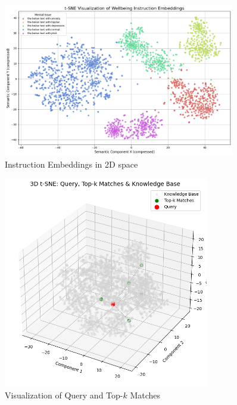 \begin{figure}[H]
    \centering
    \includegraphics[width=0.9\textwidth]{Images/RAG_WBEMBED.png}
    \caption*{Instruction Embeddings in 2D space}
    \label{fig:wellbeing_questions}
\end{figure}

\pagebreak

\begin{figure}[H]
    \centering
    \includegraphics[width=0.8\textwidth]{Images/RAG_KNOWLEDGE.png}
    \caption*{Visualization of Query and Top-\(k\) Matches}
    \label{fig:wellbeing_questions}
\end{figure}


